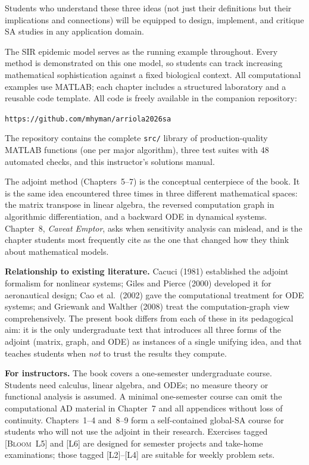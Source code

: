\documentclass[12pt]{book}
\begin{document}
Students who understand these three ideas (not just their definitions
but their implications and connections) will be equipped to design,
implement, and critique SA studies in any application domain.

\medskip

The SIR epidemic model serves as the running example throughout.
Every method is demonstrated on this one model, so students can
track increasing mathematical sophistication against a fixed biological
context.
All computational examples use MATLAB; each chapter includes a
structured laboratory and a reusable code template.
All code is freely available in the companion repository:
\begin{center}
  \texttt{https://github.com/mhyman/arriola2026sa}
\end{center}
The repository contains the complete \texttt{src/} library of
production-quality MATLAB functions (one per major algorithm),
three test suites with 48 automated checks, and this instructor's
solutions manual.

\medskip

The adjoint method (Chapters~5--7) is the
conceptual centerpiece of the book. It is the same idea encountered
three times in three different mathematical spaces: the matrix transpose
in linear algebra, the reversed computation graph in algorithmic
differentiation, and a backward ODE in dynamical systems.
Chapter~8, \emph{Caveat Emptor}, asks when sensitivity analysis can
mislead, and is the chapter students most frequently cite as the
one that changed how they think about mathematical models.

\medskip

\noindent\textbf{Relationship to existing literature.}
Cacuci (1981) established the adjoint formalism for nonlinear systems;
Giles and Pierce (2000) developed it for aeronautical design;
Cao et al.\ (2002) gave the computational treatment for ODE systems;
and Griewank and Walther (2008) treat the computation-graph view
comprehensively. The present book differs from each of these in its
pedagogical aim: it is the only undergraduate text that introduces all
three forms of the adjoint (matrix, graph, and ODE) as instances
of a single unifying idea, and that teaches students when \emph{not}
to trust the results they compute.

\medskip

\noindent\textbf{For instructors.}
The book covers a one-semester undergraduate course.
Students need calculus, linear algebra, and ODEs; no measure theory or
functional analysis is assumed.
A minimal one-semester course can omit the computational AD material
in Chapter~7 and all appendices without loss of continuity.
Chapters~1--4 and~8--9 form a self-contained global-SA course
for students who will not use the adjoint in their research.
Exercises tagged \textsc{[Bloom~L5]} and \textsc{[L6]} are designed for
semester projects and take-home examinations; those tagged \textsc{[L2]}--\textsc{[L4]}
are suitable for weekly problem sets.
\end{document}
